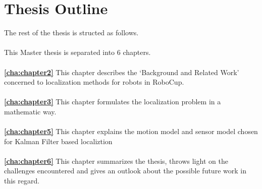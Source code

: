 \section{Thesis Outline\label{sec:outline}}

The rest of the thesis is structed as follows.
\\
\\
\noindent This Master thesis is separated into 6 chapters.
\\
\\
\textbf{\autoref{cha:chapter2}} This chapter describes the `Background and Related Work' concerned to localization methods for robots in RoboCup. 
\\
\\
\textbf{\autoref{cha:chapter3}} This chapter formulates the localization problem in a mathematic way.   
\\
\\

\textbf{\autoref{cha:chapter5}} This chapter explains the motion model and sensor model chosen for Kalman Filter based localiztion 
\\
\\
\textbf{\autoref{cha:chapter6}} This chapter summarizes the thesis, throws light on the challenges encountered and gives an outlook about the possible future work in this regard.
\\
\\
